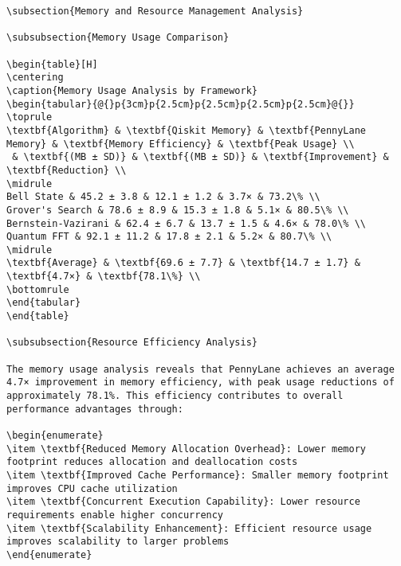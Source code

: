 \documentclass[12pt,a4paper]{report}
\begin{document}
\begin{lstlisting}
\subsection{Memory and Resource Management Analysis}

\subsubsection{Memory Usage Comparison}

\begin{table}[H]
\centering
\caption{Memory Usage Analysis by Framework}
\begin{tabular}{@{}p{3cm}p{2.5cm}p{2.5cm}p{2.5cm}p{2.5cm}@{}}
\toprule
\textbf{Algorithm} & \textbf{Qiskit Memory} & \textbf{PennyLane Memory} & \textbf{Memory Efficiency} & \textbf{Peak Usage} \\
 & \textbf{(MB ± SD)} & \textbf{(MB ± SD)} & \textbf{Improvement} & \textbf{Reduction} \\
\midrule
Bell State & 45.2 ± 3.8 & 12.1 ± 1.2 & 3.7× & 73.2\% \\
Grover's Search & 78.6 ± 8.9 & 15.3 ± 1.8 & 5.1× & 80.5\% \\
Bernstein-Vazirani & 62.4 ± 6.7 & 13.7 ± 1.5 & 4.6× & 78.0\% \\
Quantum FFT & 92.1 ± 11.2 & 17.8 ± 2.1 & 5.2× & 80.7\% \\
\midrule
\textbf{Average} & \textbf{69.6 ± 7.7} & \textbf{14.7 ± 1.7} & \textbf{4.7×} & \textbf{78.1\%} \\
\bottomrule
\end{tabular}
\end{table}

\subsubsection{Resource Efficiency Analysis}

The memory usage analysis reveals that PennyLane achieves an average 4.7× improvement in memory efficiency, with peak usage reductions of approximately 78.1%. This efficiency contributes to overall performance advantages through:

\begin{enumerate}
\item \textbf{Reduced Memory Allocation Overhead}: Lower memory footprint reduces allocation and deallocation costs
\item \textbf{Improved Cache Performance}: Smaller memory footprint improves CPU cache utilization
\item \textbf{Concurrent Execution Capability}: Lower resource requirements enable higher concurrency
\item \textbf{Scalability Enhancement}: Efficient resource usage improves scalability to larger problems
\end{enumerate}


\end{lstlisting}
\end{document}
